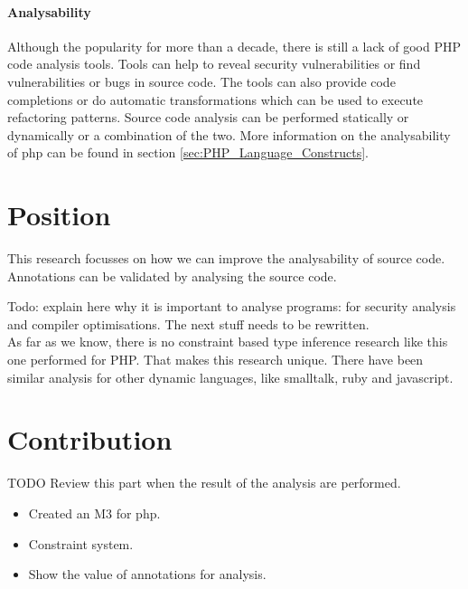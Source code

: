 \documentclass[../main.tex]{subfiles}
\begin{document}
        \paragraph{Analysability}
        Although the popularity for more than a decade, there is still a lack of good PHP code analysis tools.
        Tools can help to reveal security vulnerabilities or find vulnerabilities or bugs in source code.
        The tools can also provide code completions or do automatic transformations which can be used to execute refactoring patterns.
        Source code analysis can be performed statically or dynamically or a combination of the two.
        More information on the analysability of php can be found in section \ref{sec:PHP_Language_Constructs}.
        
    \section{Position} %
        This research focusses on how we can improve the analysability of source code.
        Annotations can be validated by analysing the source code. 
        
        Todo: explain here why it is important to analyse programs: for security analysis and compiler optimisations. The next stuff needs to be rewritten. \\
        As far as we know, there is no constraint based type inference research like this one performed for PHP.
        That makes this research unique.
        There have been similar analysis for other dynamic languages, like smalltalk, ruby and javascript.
       
    \section{Contribution} %
        TODO Review this part when the result of the analysis are performed.
        \begin{itemize}
            \item Created an M3 for php.
            \item Constraint system.
            \item Show the value of annotations for analysis.
        \end{itemize}
\end{document}
